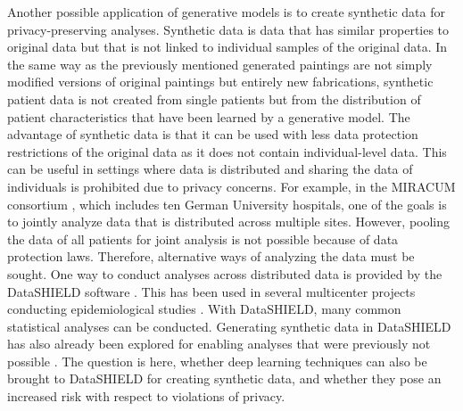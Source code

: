 \documentclass[12pt]{article}
\begin{document}
Another possible application of generative models is to create synthetic data for privacy-preserving analyses.
Synthetic data is data that has similar properties to original data but that is not linked to individual samples of the original data.
In the same way as the previously mentioned generated paintings are not simply modified versions of original paintings but entirely new fabrications,
synthetic patient data is not created from single patients but from the distribution of patient characteristics that have been learned by a generative model.
The advantage of synthetic data is that it can be used with less data protection restrictions of the original data as it does not contain individual-level data.
This can be useful in settings where data is distributed and sharing the data of individuals is prohibited due to privacy concerns.
For example, in the MIRACUM consortium \citep{prokosch_miracum_2018}, which includes ten German University hospitals,
one of the goals is to jointly analyze data that is distributed across multiple sites.
However, pooling the data of all patients for joint analysis is not possible because of data protection laws.
Therefore, alternative ways of analyzing the data must be sought. 
One way to conduct analyses across distributed data is provided by the DataSHIELD software \citep{gaye_datashield,budin-ljosne_datashield}.
This has been used in several multicenter projects conducting epidemiological studies \citep{doiron_datashield_2013, pastorino_datashield_2019, oluwagbemigun_datashield_2020}.
With DataSHIELD, many common statistical analyses can be conducted.
Generating synthetic data in DataSHIELD has also already been explored for enabling analyses that were previously not possible \citep{bonofiglio2020}.
The question is here, whether deep learning techniques can also be brought to DataSHIELD for creating synthetic data, and whether they pose an increased risk with respect to violations of privacy.

\end{document}

